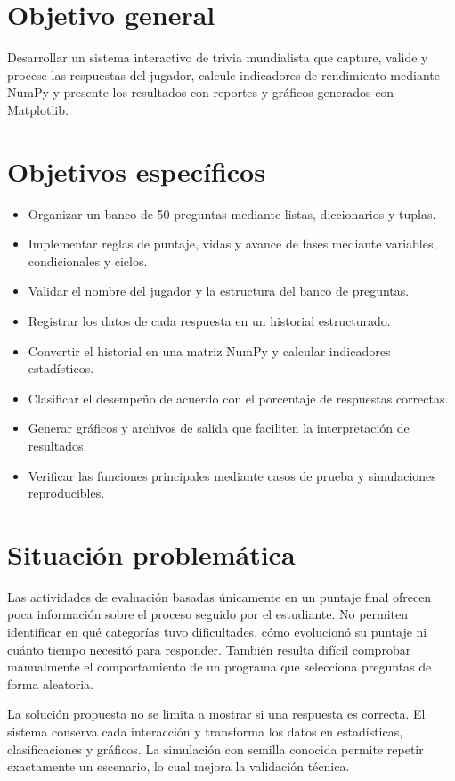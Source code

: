 \documentclass[stu,12pt,a4paper,biblatex,floatsintext]{apa7}
\begin{document}
\section{Objetivo general}

Desarrollar un sistema interactivo de trivia mundialista que capture, valide y procese las respuestas del jugador, calcule indicadores de rendimiento mediante NumPy y presente los resultados con reportes y gráficos generados con Matplotlib.

\section{Objetivos específicos}

\begin{itemize}
  \item Organizar un banco de 50 preguntas mediante listas, diccionarios y tuplas.
  \item Implementar reglas de puntaje, vidas y avance de fases mediante variables, condicionales y ciclos.
  \item Validar el nombre del jugador y la estructura del banco de preguntas.
  \item Registrar los datos de cada respuesta en un historial estructurado.
  \item Convertir el historial en una matriz NumPy y calcular indicadores estadísticos.
  \item Clasificar el desempeño de acuerdo con el porcentaje de respuestas correctas.
  \item Generar gráficos y archivos de salida que faciliten la interpretación de resultados.
  \item Verificar las funciones principales mediante casos de prueba y simulaciones reproducibles.
\end{itemize}

\section{Situación problemática}

Las actividades de evaluación basadas únicamente en un puntaje final ofrecen poca información sobre el proceso seguido por el estudiante. No permiten identificar en qué categorías tuvo dificultades, cómo evolucionó su puntaje ni cuánto tiempo necesitó para responder. También resulta difícil comprobar manualmente el comportamiento de un programa que selecciona preguntas de forma aleatoria.

La solución propuesta no se limita a mostrar si una respuesta es correcta. El sistema conserva cada interacción y transforma los datos en estadísticas, clasificaciones y gráficos. La simulación con semilla conocida permite repetir exactamente un escenario, lo cual mejora la validación técnica.
\end{document}
